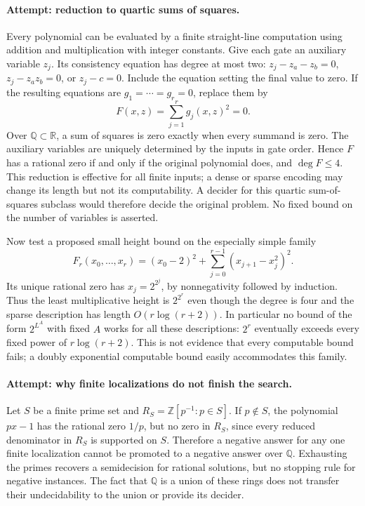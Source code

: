 \documentclass[11pt,a4paper]{article}
\newcommand{\Z}{\mathbb{Z}}
\newcommand{\Q}{\mathbb{Q}}
\newcommand{\R}{\mathbb{R}}
\begin{document}
\paragraph{Attempt: reduction to quartic sums of squares.}
Every polynomial can be evaluated by a finite straight-line computation
using addition and multiplication with integer constants. Give each gate
an auxiliary variable $z_j$. Its consistency equation has degree at most
two: $z_j-z_a-z_b=0$, $z_j-z_az_b=0$, or $z_j-c=0$.
Include the equation setting the final value to zero. If the resulting
equations are $g_1=\cdots=g_r=0$, replace them by
\[
 F(x,z)=\sum_{j=1}^r g_j(x,z)^2=0.
 \tag{21.3}
\]
Over $\Q\subset\R$, a sum of squares is zero exactly when every summand
is zero. The auxiliary variables are uniquely determined by the inputs
in gate order. Hence $F$ has a rational zero if and only if the original
polynomial does, and $\deg F\leq4$. This reduction is effective for all
finite inputs; a dense or sparse encoding may change its length but not
its computability. A decider for this quartic sum-of-squares subclass
would therefore decide the original problem. No fixed bound on the
number of variables is asserted.

Now test a proposed small height bound on the especially simple family
\[
 F_r(x_0,\ldots,x_r)=(x_0-2)^2+
              \sum_{j=0}^{r-1}(x_{j+1}-x_j^2)^2.
 \tag{21.4}
\]
Its unique rational zero has $x_j=2^{2^j}$, by nonnegativity followed by
induction. Thus the least multiplicative height is $2^{2^r}$ even though
the degree is four and the sparse description has length $O(r\log(r+2))$.
In particular no bound of the form $2^{L^A}$ with fixed $A$ works for all
these descriptions: $2^r$ eventually exceeds every fixed power of
$r\log(r+2)$. This is not evidence that every computable bound fails;
a doubly exponential computable bound easily accommodates this family.

\paragraph{Attempt: why finite localizations do not finish the search.}
Let $S$ be a finite prime set and $R_S=\Z[p^{-1}:p\in S]$. If
$p\notin S$, the polynomial $px-1$ has the rational zero $1/p$, but no
zero in $R_S$, since every reduced denominator in $R_S$ is supported on
$S$. Therefore a negative answer for any one finite localization cannot
be promoted to a negative answer over $\Q$. Exhausting the primes
recovers a semidecision for rational solutions, but no stopping rule for
negative instances. The fact that $\Q$ is a union of these rings does
not transfer their undecidability to the union or provide its decider.
\end{document}
